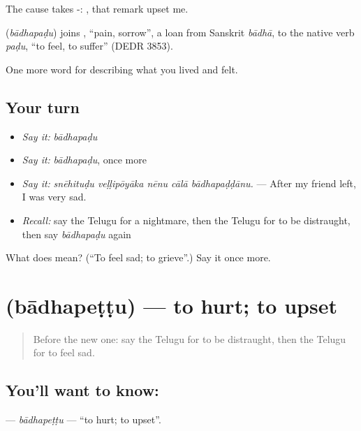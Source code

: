 The cause takes -:   , that remark upset me.

\begin{cousinweb}
\textbf{} (\emph{bādhapaḍu}) joins , \textquotedblleft{}pain, sorrow\textquotedblright{}, a loan from Sanskrit \emph{bādhā}, to the native verb \emph{paḍu}, \textquotedblleft{}to feel, to suffer\textquotedblright{} (DEDR 3853).
\end{cousinweb}

\begin{grammarlens}[title={What you've built}]
One more word for describing what you lived and felt.
\end{grammarlens}

\subsection*{Your turn}
\begin{itemize}
\raggedright
  \item \emph{Say it:} \emph{bādhapaḍu}
  \item \emph{Say it:} \emph{bādhapaḍu}, once more
  \item \emph{Say it:} \emph{snēhituḍu veḷḷipōyāka nēnu cālā bādhapaḍḍānu.} — After my friend left, I was very sad.
  \item \emph{Recall:} say the Telugu for a nightmare, then the Telugu for to be distraught, then say \emph{bādhapaḍu} again
\end{itemize}

\begin{tcolorbox}[breakable,colback=teal!4,colframe=teal!35!black,title={Before you move on}]
What does  mean? (\textquotedblleft{}To feel sad; to grieve\textquotedblright{}.) Say it once more.
\end{tcolorbox}
\section[\texorpdfstring{\te{బాధపెట్టు} (bādhapeṭṭu)}{బాధపెట్టు (bādhapeṭṭu)}]{ (bādhapeṭṭu) — to hurt; to upset}

\label{lesson:TE-C496-badhapettu}



\begin{quote}
Before the new one: say the Telugu for to be distraught, then the Telugu for to feel sad.
\end{quote}

\subsection*{You'll want to know: }
\textbf{} — \emph{bādhapeṭṭu} — \textquotedblleft{}to hurt; to upset\textquotedblright{}.

